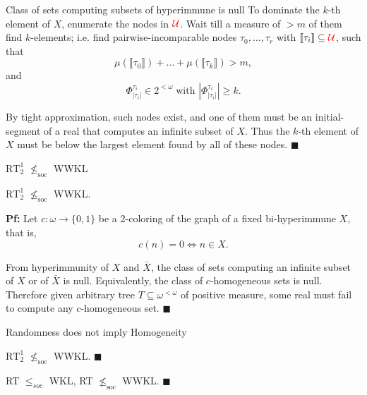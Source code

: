 \begin{frame}{Class of sets computing subsets of hyperimmune is null}
  To dominate the $k$-th element of $X$, enumerate the nodes in
  $\textcolor{red}{\mathcal{U}}$. Wait till a measure of $>m$ of them find
  $k$-elements; i.e. find pairwise-incomparable nodes
  $\tau_0,\ldots,\tau_r$ with $\llbracket\tau_i\rrbracket \subseteq
  \textcolor{red}{\mathcal{U}}$, such that
  \[\mu(\llbracket\tau_0\rrbracket) +\ldots
  +\mu(\llbracket\tau_k\rrbracket) >m,\]
  and
  \[\Phi^{\tau_i}_{|\tau_i|} \in 2^{<\omega}\; \text{with }
  |\Phi^{\tau_i}_{|\tau_i|}|\geq k.\]

  \vspace{2em}
  By tight approximation, such nodes exist, and one of them must be an
  initial-segment of a real that computes an infinite subset of $X$. Thus
  the $k$-th element of $X$ must be below the largest element found by all
  of these nodes. $\blacksquare$
\end{frame}

\begin{frame}{$\text{RT}_2^1$ $\nleq_{\text{soc}}$ WWKL}
  \begin{thm}
    $\text{RT}_2^1$ $\nleq_{\text{soc}}$ WWKL.
  \end{thm}

  \vspace{1em}
  \textbf{Pf:} Let $c:\omega\rightarrow\{0,1\}$ be a 2-coloring of the
  graph of a fixed bi-hyperimmune $X$, that is,
  \[c(n)=0 \Leftrightarrow n\in X.\]
  
  From hyperimmunity of $X$ and $\bar{X}$, the class of sets computing an
  infinite subset of $X$ or of $\bar{X}$ is null. Equivalently, the class
  of $c$-homogeneous sets is null. Therefore given arbitrary tree
  $T\subseteq\omega^{<\omega}$ of positive measure, some real must fail to
  compute any $c$-homogeneous set. $\blacksquare$
\end{frame}

\begin{frame}{Randomness does not imply Homogeneity}
  \begin{coro}
    $\text{RT}_2^1$ $\nleq_{\text{soc}}$ WWKL. $\blacksquare$
  \end{coro}
  \begin{coro}
    RT $\leq_{soc}$ WKL, RT $\nleq_{\text{soc}}$ WWKL. $\blacksquare$
  \end{coro}

  \vspace{1em}
  \begin{center}
  \end{center}
\end{frame}
